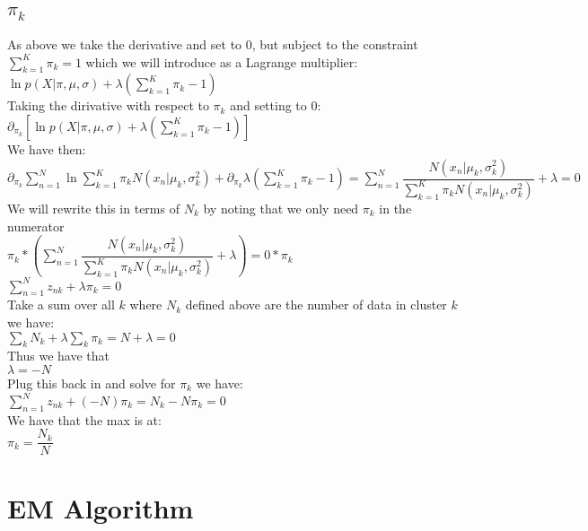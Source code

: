 \documentclass[12pt]{article}
\begin{document}
\subsection{$\pi_k$}

\begin{center}
    As above we take the derivative and set to 0, but subject to the constraint $\sum_{k=1}^K \pi_k = 1$ which we will introduce as a Lagrange multiplier: \\
    
   $ \ln p(X|\pi,\mu,\sigma) + \lambda (\sum_{k=1}^K \pi_k - 1)$ \\
   Taking the dirivative with respect to $\pi_k$ and setting to 0:\\
  $ \partial_{\pi_k} \left[ \ln p(X|\pi,\mu,\sigma) + \lambda (\sum_{k=1}^K \pi_k - 1)  \right]$ \\
  We have then: \\
  $\partial_{\pi_k}  \sum_{n=1}^N \ln   \sum_{k=1}^K \pi_k  N(x_n| \mu_k, \sigma_k^2) +\partial_{\pi_k}  \lambda (\sum_{k=1}^K \pi_k - 1) = \sum_{n=1}^N \dfrac{N(x_n| \mu_k, \sigma_k^2)}{\sum_{k=1}^K \pi_k  N(x_n| \mu_k, \sigma_k^2)} + \lambda = 0$ \\
  We will rewrite this in terms of $N_k$ by noting that we only need $\pi_k$ in the numerator\\
   $\pi_k * ( \sum_{n=1}^N \dfrac{N(x_n| \mu_k, \sigma_k^2)}{\sum_{k=1}^K \pi_k  N(x_n| \mu_k, \sigma_k^2)} + \lambda ) = 0 * \pi_k$ \\
   $ \sum_{n=1}^N z_{nk} + \lambda \pi_k = 0$ \\ 
   Take a sum over all $k$ where $N_k$ defined above are the number of data in cluster $k$ we have: \\
   $ \sum_{k} N_k + \lambda \sum_{k} \pi_k = N + \lambda = 0 $ \\
   Thus we have that \\
   $\lambda = - N$ \\
   Plug this back in and solve for $\pi_k$ we have: \\
  $ \sum_{n=1}^N z_{nk} + (-N) \pi_k = N_k - N \pi_k = 0$ \\
  We have that the max is at: \\
 $ \pi_k = \dfrac{N_k}{N}$
    
\end{center}

\section{EM Algorithm}
\end{document}

